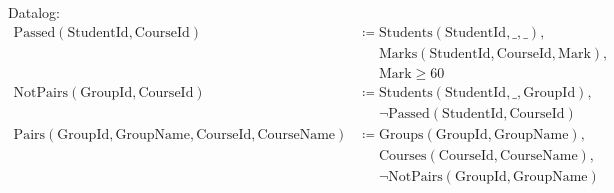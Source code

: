 \documentclass{article}
\newcommand{\Students}{\mathrm{Students}}
\newcommand{\StudentId}{\mathrm{StudentId}}
\newcommand{\Groups}{\mathrm{Groups}}
\newcommand{\GroupId}{\mathrm{GroupId}}
\newcommand{\GroupName}{\mathrm{GroupName}}
\newcommand{\Courses}{\mathrm{Courses}}
\newcommand{\CourseId}{\mathrm{CourseId}}
\newcommand{\CourseName}{\mathrm{CourseName}}
\newcommand{\Marks}{\mathrm{Marks}}
\newcommand{\Mark}{\mathrm{Mark}}
\newcommand{\poloneq}{\mathrel{\phantom{\coloneq}}}
\begin{document}
\begin{enumerate}
\[    \]
    Datalog:
    \begin{align*}
        \mathrm{Passed}(\StudentId, \CourseId)
        &\coloneq \Students(\StudentId, \_, \_), \\
        &\poloneq \Marks(\StudentId, \CourseId, \Mark), \\
        &\poloneq \Mark \geq 60 \\
        \mathrm{NotPairs}(\GroupId, \CourseId)
        &\coloneq \Students(\StudentId, \_, \GroupId), \\
        &\poloneq \neg \mathrm{Passed}(\StudentId, \CourseId) \\
        \mathrm{Pairs}(\GroupId, \GroupName, \CourseId, \CourseName)
        &\coloneq \Groups(\GroupId, \GroupName), \\
        &\poloneq \Courses(\CourseId, \CourseName), \\
        &\poloneq \neg \mathrm{NotPairs}(\GroupId, \GroupName)
    \end{align*}
\end{enumerate}
\end{document}
